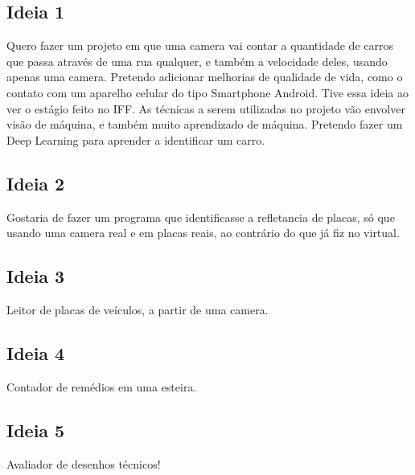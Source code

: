 \documentclass[14pt]{scrartcl} %
\begin{document}
\subsection{Ideia 1}
Quero fazer um projeto em que uma camera vai contar a quantidade de carros que passa através de uma rua qualquer, e também a velocidade deles, usando apenas uma camera. Pretendo adicionar melhorias de qualidade de vida, como o contato com um aparelho celular do tipo Smartphone Android. Tive essa ideia ao ver o estágio feito no IFF. \newline
As técnicas a serem utilizadas no projeto vão envolver visão de máquina, e também muito aprendizado de máquina. Pretendo fazer um Deep Learning para aprender a identificar um carro.

\subsection{Ideia 2}
Gostaria de fazer um programa que identificasse a refletancia de placas, só que usando uma camera real e em placas reais, ao contrário do que já fiz no virtual.

\subsection{Ideia 3}
Leitor de placas de veículos, a partir de uma camera.

\subsection{Ideia 4}
Contador de remédios em uma esteira.

\subsection{Ideia 5}
Avaliador de desenhos técnicos!
\end{document}
